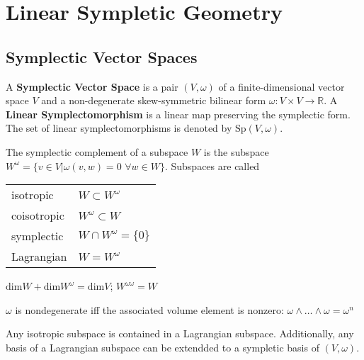 
\section{Linear Sympletic Geometry}
\subsection{Symplectic Vector Spaces}
\begin{defn}

A \textbf{Symplectic Vector Space} is a pair $(V,\omega)$ of a finite-dimensional vector space $V$ and a non-degenerate skew-symmetric bilinear form $\omega: V \times V \to \mathbb{R}$. A \textbf{Linear Symplectomorphism} is a linear map preserving the symplectic form. The set of linear symplectomorphisms is denoted by $\mathrm{Sp}(V,\omega)$.

\end{defn}

\begin{defn}

The symplectic complement of a subspace $W$ is the subspace $W^{\omega} = \{v \in V \vert \omega(v,w)=0 \hspace{4pt} \forall w \in W\}$. Subspaces are called \\

\begin{tabular}{l|l}
     isotropic & $W \subset W^{\omega}$ \\
     coisotropic & $W^{\omega} \subset W$ \\
     symplectic & $W \cap W^{\omega} = \{0\}$ \\
     Lagrangian & $W = W^{\omega}$
\end{tabular}

\end{defn}

\begin{lem}

$\mathrm{dim}W + \mathrm{dim}W^{\omega} = \mathrm{dim}V$; $W^{\omega \omega} = W$

\end{lem}

\begin{cor}

$\omega$ is nondegenerate iff the associated volume element is nonzero: $\omega \wedge \ldots \wedge \omega = \omega^n$

\end{cor}

\begin{lem}

Any isotropic subspace is contained in a Lagrangian subspace. Additionally, any basis of a Lagrangian subspace can be extendded to a sympletic basis of $(V,\omega)$.

\end{lem}

